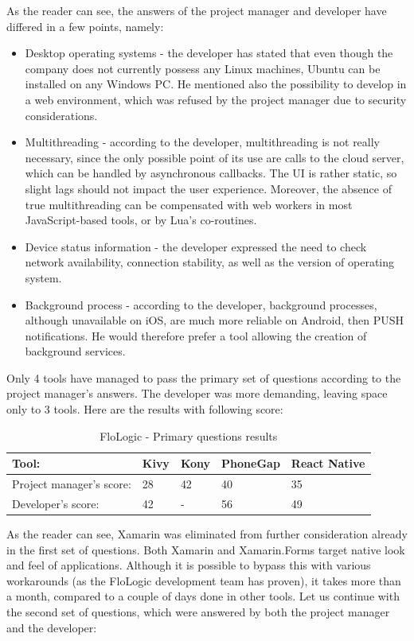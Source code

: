 \documentclass[english,master,public,dept460,male,cpdeclaration,oneside]{diploma}
\begin{document}
As the reader can see, the answers of the project manager and developer have differed in a few points, namely:
\begin{itemize}
	\item Desktop operating systems - the developer has stated that even though the company does not currently possess any Linux machines, Ubuntu can be installed on any Windows PC. He mentioned also the possibility to develop in a web environment, which was refused by the project manager due to security considerations.
	\item Multithreading - according to the developer, multithreading is not really necessary, since the only possible point of its use are calls to the cloud server, which can be handled by asynchronous callbacks. The UI is rather static, so slight lags should not impact the user experience. Moreover, the absence of true multithreading can be compensated with web workers in most JavaScript-based tools, or by Lua’s co-routines.
	\item Device status information - the developer expressed the need to check network availability, connection stability, as well as the version of operating system.
	\item Background process - according to the developer, background processes, although unavailable on iOS, are much more reliable on Android, then PUSH notifications. He would therefore prefer a tool allowing the creation of background services.
\end{itemize}

Only 4 tools have managed to pass the primary set of questions according to the project manager’s answers. The developer was more demanding, leaving space only to 3 tools. Here are the results with following score:

\begin{table}[!h]
	\centering
	\caption{FloLogic - Primary questions results}
	\begin{tabular}{p{4cm} | p{2cm} | p{2cm} | p{2cm} | p{2cm}}
		\toprule		
		\textbf{Tool:} & \textbf{Kivy} & \textbf{Kony} & \textbf{PhoneGap} & \textbf{React Native} \\
		\midrule
		Project manager’s score: & 28 & 42 & 40 & 35 \\
		Developer’s score: & 42 & - & 56 & 49 \\			
		\midrule
	\end{tabular}
\end{table}

As the reader can see, Xamarin was eliminated from further consideration already in the first set of questions. Both Xamarin and Xamarin.Forms target native look and feel of applications. Although it is possible to bypass this with various workarounds (as the FloLogic development team has proven), it takes more than a month, compared to a couple of days done in other tools. 
Let us continue with the second set of questions, which were answered by both the project manager and the developer:
\end{document}
